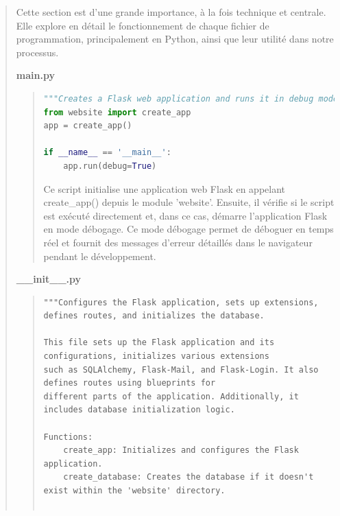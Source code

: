\documentclass{article}
\begin{document}
\begin{quote}
    Cette section est d'une grande importance, à la fois technique et centrale. Elle explore en détail le fonctionnement de chaque fichier de programmation, principalement en Python, ainsi que leur utilité dans notre processus.

    \textbf{main.py}
    \vspace*{1\baselineskip}
    \begin{quote}
        \begin{tcolorbox}[colback=grisClair,colframe=black]
            \begin{lstlisting}[language=Python]
"""Creates a Flask web application and runs it in debug mode."""
from website import create_app
app = create_app()

if __name__ == '__main__':
    app.run(debug=True)
            \end{lstlisting}
            \end{tcolorbox}
        
        \vspace*{1\baselineskip}
            
    Ce script initialise une application web Flask en appelant create\_app() depuis le module 'website'. Ensuite, il vérifie si le script est exécuté directement et, dans ce cas, démarre l'application Flask en mode débogage. 
    Ce mode débogage permet de déboguer en temps réel et fournit des messages d'erreur détaillés dans le navigateur pendant le développement.
    \end{quote}

    \newpage
    \textbf{\_\_init\_\_.py}
    \vspace*{1\baselineskip}
    \begin{quote}
        \begin{tcolorbox}[colback=grisClair,colframe=black]
        \begin{lstlisting}
"""Configures the Flask application, sets up extensions, defines routes, and initializes the database.

This file sets up the Flask application and its configurations, initializes various extensions
such as SQLAlchemy, Flask-Mail, and Flask-Login. It also defines routes using blueprints for
different parts of the application. Additionally, it includes database initialization logic.

Functions:
    create_app: Initializes and configures the Flask application.
    create_database: Creates the database if it doesn't exist within the 'website' directory.


\end{lstlisting}
\end{tcolorbox}
\end{quote}
\end{quote}
\end{document}
